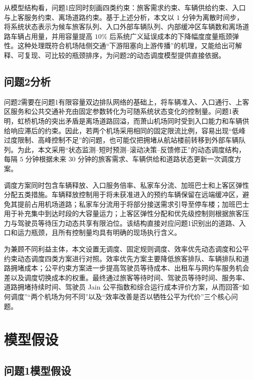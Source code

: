 \documentclass[UTF8,a4paper,11pt,onecolumn,fontset=none]{ctexart}
\begin{document}
从模型结构看，问题1应同时刻画四类约束：旅客需求约束、车辆供给约束、入口与上客服务约束、离场道路约束。基于上述分析，本文以 $1$ 分钟为离散时间步，将系统状态表示为候车旅客队列、入口外部车辆队列、内部缓冲区车辆数和离场道路车辆占用量，并用容量提高 $10\%$ 后系统广义延误成本的下降幅度度量瓶颈弹性。这种处理既符合机场陆侧交通“下游阻塞向上游传播”的机理，又能给出可解释、可复现、可比较的瓶颈排序，为问题2的动态调度模型提供直接依据。

\subsection{问题2分析}

问题2需要在问题1有限容量双边排队网络的基础上，将车辆准入、入口通行、上客区服务和公共交通补充由固定参数转化为可随系统状态变化的控制量。问题1表明，虹桥机场的突出矛盾是离场道路回溢，而萧山机场同时受到入口能力和车辆供给响应滞后的约束。因此，若两个机场采用相同的固定限流比例，容易出现“低峰过度限制、高峰控制不足”的问题，也可能仅把拥堵从航站楼前转移到外部车辆队列。为此，本文采用“状态监测--短时预测--滚动决策--反馈修正”的动态调度结构，每隔 $5$ 分钟根据未来 $30$ 分钟的旅客需求、车辆供给和道路状态更新一次调度方案。

调度方案同时包含车辆释放、入口服务倍率、私家车分流、加班巴士和上客区弹性分配五类措施。车辆释放控制用于将未获准进入的预约车辆保留在远端缓冲区，避免其提前占用机场道路；私家车分流用于将部分接送需求引导至停车楼；加班巴士用于补充集中到达时段的大容量运力；上客区弹性分配和优先级控制则根据旅客压力与驾驶员等待压力动态共享有限泊位。该结构直接对应问题1识别出的道路、入口和运力瓶颈，且所有控制量均具有明确的现场执行含义。

为兼顾不同利益主体，本文设置无调度、固定规则调度、效率优先动态调度和公平约束动态调度四类方案进行对照。效率优先方案主要降低旅客排队、车辆排队和道路拥堵成本；公平约束方案进一步提高驾驶员等待成本、出租车与网约车服务机会差以及调度切换成本的权重。最终通过旅客等待时间、驾驶员等待时间、服务率、道路拥堵持续时间、驾驶员 Jain 公平指数和综合运行成本评价方案，从而回答“如何调度”“两个机场为何不同”以及“效率改善是否以牺牲公平为代价”三个核心问题。


\section{模型假设}
\label{sec3}

\subsection{问题1模型假设}
\end{document}
